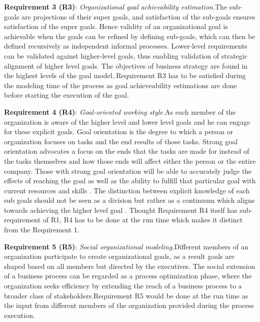 \hspace{4ex} \textbf{Requirement 3 (R3)}: \textit{Organizational goal achievability estimation.}The sub-goals are projections of their super goals, and satisfaction of the sub-goals ensures satisfaction of the super goals. Hence validity of an organizational goal is achievable when the goals can be refined by defining sub-goals, which can then be defined recursively as independent informal processes. Lower-level requirements can be validated against higher-level goals, thus enabling validation of strategic alignment of  higher level goals. The objectives of business strategy are found in the highest levels of the goal model.\cite{Bleistein2006}.Requirement R3 has to be satisfied during the modeling time of the process as goal achieveability estimations are done before starting the execution of the goal.

\hspace{4ex} \textbf{Requirement 4 (R4)}: \textit{Goal-oriented working style.}As each member of the organization is aware of the higher level and lower level goals and he can engage for these explicit goals. Goal orientation is the degree to which a person or organization focuses on tasks and the end results of those tasks. Strong goal orientation advocates a focus on the ends that the tasks are made for instead of the tasks themselves and how those ends will affect either the person or the entire company. Those with strong goal orientation will be able to accurately judge the effects of reaching the goal as well as the ability to fulfill that particular goal with current resources and skills \cite{Lacom}. The distinction between explicit knowledge of each sub goals should not be seen as a division but rather as a continuum which aligns towards achieving the higher level goal . Thought Requirement R4 itself has sub-requirement of R1, R4 has to be done at the run time which makes it distinct from the Requirement 1.

\hspace{4ex} \textbf{Requirement 5 (R5)}: \textit{Social organizational modeling.}Different members of an organization participate to create organizational goals, as a result goals are shaped based on all members but directed by the executives. The  social  extension  of  a  business  process  can  be  regarded  as  a  process optimization phase, where the organization seeks efficiency  by  extending  the  reach  of  a  business  process  to  a  broader  class  of  stakeholders\cite{Brambilla2012}.Requirement R5 would be done at the run time as the input from different members of the organization provided during the process execution.



